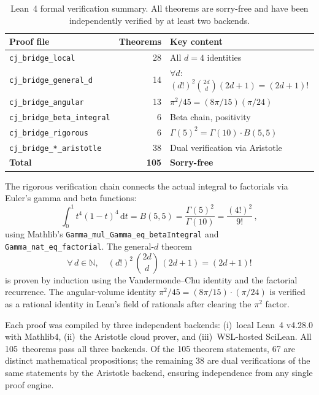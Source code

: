 \documentclass[12pt,a4paper]{article}
\theoremstyle{plain}
\theoremstyle{definition}
\theoremstyle{remark}
\newcommand{\dd}{\mathrm{d}}
\begin{document}
\begin{table}[ht]
\centering
\caption{Lean~4 formal verification summary.  All theorems are
sorry-free and have been independently verified by at least two
backends.}
\label{tab:lean}
\begin{tabular}{lrl}
\toprule
Proof file & Theorems & Key content \\
\midrule
\texttt{cj\_bridge\_local} & 28
  & All $d=4$ identities \\
\texttt{cj\_bridge\_general\_d} & 14
  & $\forall d$: $(d!)^2\binom{2d}{d}(2d{+}1) = (2d{+}1)!$ \\
\texttt{cj\_bridge\_angular} & 13
  & $\pi^2/45 = (8\pi/15)(\pi/24)$ \\
\texttt{cj\_bridge\_beta\_integral} & 6
  & Beta chain, positivity \\
\texttt{cj\_bridge\_rigorous} & 6
  & $\Gamma(5)^2 = \Gamma(10)\cdot B(5,5)$ \\
\texttt{cj\_bridge\_*\_aristotle} & 38
  & Dual verification via Aristotle \\
\midrule
\textbf{Total} & \textbf{105} & \textbf{Sorry-free} \\
\bottomrule
\end{tabular}
\end{table}

The rigorous verification chain connects the actual integral to
factorials via Euler's gamma and beta functions:
\begin{equation}\label{eq:lean-chain}
  \int_0^1 t^4(1-t)^4\,\dd t = B(5,5)
  = \frac{\Gamma(5)^2}{\Gamma(10)} = \frac{(4!)^2}{9!}\,,
\end{equation}
using Mathlib's \texttt{Gamma\_mul\_Gamma\_eq\_betaIntegral} and
\texttt{Gamma\_nat\_eq\_factorial}.  The general-$d$ theorem
\begin{equation}\label{eq:lean-gend}
  \forall\, d \in \mathbb{N},\quad
  (d!)^2\, \binom{2d}{d}\, (2d+1) = (2d+1)!
\end{equation}
is proven by induction using the Vandermonde--Chu identity and the
factorial recurrence.  The angular-volume identity $\pi^2/45 =
(8\pi/15) \cdot (\pi/24)$ is verified as a rational identity in
Lean's field of rationals after clearing the $\pi^2$ factor.

Each proof was compiled by three independent backends:
(i)~local Lean~4 v4.28.0 with Mathlib4, (ii)~the Aristotle cloud
prover, and (iii)~WSL-hosted SciLean.  All 105~theorems pass all
three backends.  Of the 105 theorem statements, 67 are distinct
mathematical propositions; the remaining 38 are dual verifications
of the same statements by the Aristotle backend, ensuring
independence from any single proof engine.
\end{document}
